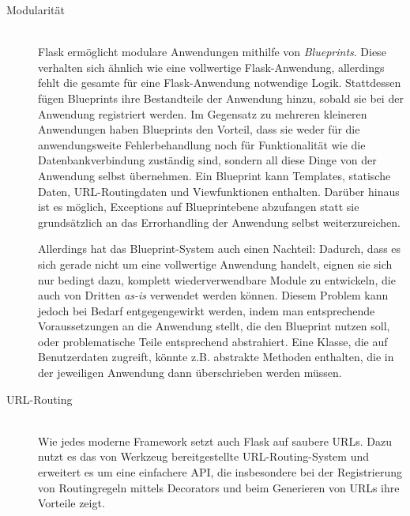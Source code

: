 \begin{description}
\item[Modularität] \hfill \\
Flask ermöglicht modulare Anwendungen mithilfe von \emph{Blueprints}. Diese verhalten sich ähnlich
wie eine vollwertige Flask-Anwendung, allerdings fehlt die gesamte für eine Flask-Anwendung
notwendige Logik. Stattdessen fügen Blueprints ihre Bestandteile der Anwendung hinzu, sobald sie bei
der Anwendung registriert werden. Im Gegensatz zu mehreren kleineren Anwendungen haben
Blueprints den Vorteil, dass sie weder für die anwendungsweite Fehlerbehandlung noch für
Funktionalität wie die Datenbankverbindung zuständig sind, sondern all diese Dinge von der Anwendung
selbst übernehmen.
Ein Blueprint kann Templates, statische Daten, URL-Routingdaten und Viewfunktionen enthalten.
Darüber hinaus ist es möglich, Exceptions auf Blueprintebene abzufangen statt sie grundsätzlich an
das Errorhandling der Anwendung selbst weiterzureichen.

Allerdings hat das Blueprint-System auch einen Nachteil: Dadurch, dass es sich gerade nicht um eine
vollwertige Anwendung handelt, eignen sie sich nur bedingt dazu, komplett wiederverwendbare Module
zu entwickeln, die auch von Dritten \emph{as-is} verwendet werden können. Diesem Problem kann jedoch
bei Bedarf entgegengewirkt werden, indem man entsprechende Voraussetzungen an die Anwendung stellt,
die den Blueprint nutzen soll, oder problematische Teile entsprechend abstrahiert. Eine Klasse, die
auf Benutzerdaten zugreift, könnte z.B. abstrakte Methoden enthalten, die in der jeweiligen
Anwendung dann überschrieben werden müssen.


\item[URL-Routing] \hfill \\
Wie jedes moderne Framework setzt auch Flask auf saubere URLs. Dazu nutzt es das von Werkzeug
bereitgestellte URL-Routing-System und erweitert es um eine einfachere API, die insbesondere bei der
Registrierung von Routingregeln mittels Decorators und beim Generieren von URLs ihre Vorteile zeigt.


\end{description}
